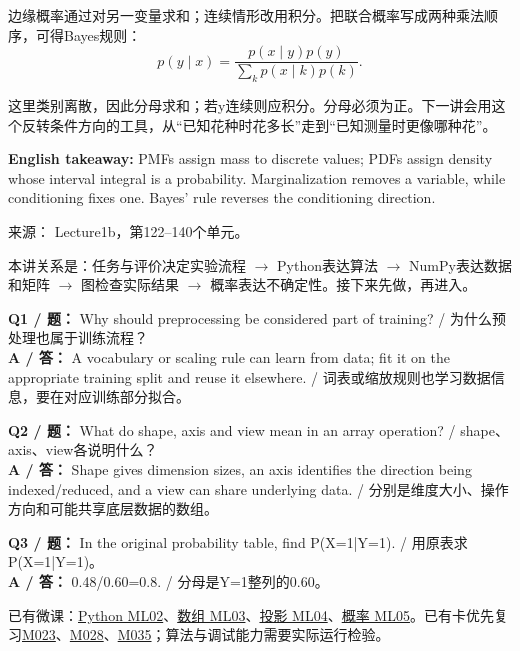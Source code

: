 边缘概率通过对另一变量求和；连续情形改用积分。把联合概率写成两种乘法顺序，可得Bayes规则：
\[
p(y\mid x)=\frac{p(x\mid y)p(y)}{\sum_k p(x\mid k)p(k)}.\tag{1.4}
\]


这里类别离散，因此分母求和；若y连续则应积分。分母必须为正。下一讲会用这个反转条件方向的工具，从“已知花种时花多长”走到“已知测量时更像哪种花”。


\textbf{English takeaway:} PMFs assign mass to discrete values; PDFs assign density whose interval integral is a probability. Marginalization removes a variable, while conditioning fixes one. Bayes' rule reverses the conditioning direction.


来源： Lecture1b，第122–140个单元。








本讲关系是：任务与评价决定实验流程 \ensuremath{\to} Python表达算法 \ensuremath{\to} NumPy表达数据和矩阵 \ensuremath{\to} 图检查实际结果 \ensuremath{\to} 概率表达不确定性。接下来先做，再进入。


\textbf{Q1 / 题：} Why should preprocessing be considered part of training? / 为什么预处理也属于训练流程？\\

\textbf{A / 答：} A vocabulary or scaling rule can learn from data; fit it on the appropriate training split and reuse it elsewhere. / 词表或缩放规则也学习数据信息，要在对应训练部分拟合。


\textbf{Q2 / 题：} What do shape, axis and view mean in an array operation? / shape、axis、view各说明什么？\\

\textbf{A / 答：} Shape gives dimension sizes, an axis identifies the direction being indexed/reduced, and a view can share underlying data. / 分别是维度大小、操作方向和可能共享底层数据的数组。


\textbf{Q3 / 题：} In the original probability table, find P(X=1|Y=1). / 用原表求P(X=1|Y=1)。\\

\textbf{A / 答：} 0.48/0.60=0.8. / 分母是Y=1整列的0.60。


已有微课：\href{https://crazyshout.github.io/micro-course/?lesson=ml02}{Python ML02}、\href{https://crazyshout.github.io/micro-course/?lesson=ml03}{数组 ML03}、\href{https://crazyshout.github.io/micro-course/?lesson=ml04}{投影 ML04}、\href{https://crazyshout.github.io/micro-course/?lesson=ml05}{概率 ML05}。已有卡优先复习\href{https://crazyshout.github.io/micro-course/cards.html\#CS5489-M023}{M023}、\href{https://crazyshout.github.io/micro-course/cards.html\#CS5489-M028}{M028}、\href{https://crazyshout.github.io/micro-course/cards.html\#CS5489-M035}{M035}；算法与调试能力需要实际运行检验。


